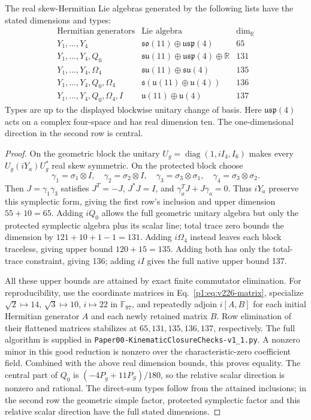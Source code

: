 \documentclass[11pt]{article}
\begin{document}
\begin{theorem}
\label{p1:thm:v226-control-lie}
The real skew-Hermitian Lie algebras generated by the following lists
have the stated dimensions and types:
\[
\begin{array}{c|c|c}
 \text{Hermitian generators}&\text{Lie algebra}&\dim_{\mathbb R}\\\hline
 Y_1,\ldots,Y_4&\mathfrak{so}(11)\oplus\mathfrak{usp}(4)&65\\
 Y_1,\ldots,Y_4,Q_0&\mathfrak{su}(11)\oplus\mathfrak{usp}(4)\oplus\mathbb R&131\\
 Y_1,\ldots,Y_4,\Omega_4&\mathfrak{su}(11)\oplus\mathfrak{su}(4)&135\\
 Y_1,\ldots,Y_4,Q_0,\Omega_4&\mathfrak{s}(\mathfrak u(11)\oplus\mathfrak u(4))&136\\
 Y_1,\ldots,Y_4,Q_0,\Omega_4,I&\mathfrak u(11)\oplus\mathfrak u(4)&137
\end{array}
\]
Types are up to the displayed blockwise unitary change of basis. Here
$\mathfrak{usp}(4)$ acts on a complex four-space and has real dimension ten.
The one-dimensional direction in the second row is central.
\end{theorem}
\begin{proof}
On the geometric block the unitary
$U_g=\operatorname{diag}(1,iI_4,I_6)$ makes every $U_g(iY_a)U_g^*$
real skew symmetric. On the protected block choose
\[
 \gamma_1=\sigma_1\otimes I,\quad
 \gamma_2=\sigma_2\otimes I,\quad
 \gamma_3=\sigma_3\otimes\sigma_1,\quad
 \gamma_4=\sigma_3\otimes\sigma_2.
\]
Then $J=\gamma_1\gamma_3$ satisfies $J^T=-J$, $J^*J=I$, and
$\gamma_a^TJ+J\gamma_a=0$. Thus $iY_a$ preserve this symplectic form,
giving the first row's inclusion and upper dimension $55+10=65$.
Adding $iQ_0$ allows the full geometric unitary algebra but only the
protected symplectic algebra plus its scalar line; total trace zero bounds
the dimension by $121+10+1-1=131$.
Adding $i\Omega_4$ instead leaves each block traceless, giving upper bound
$120+15=135$. Adding both has only the total-trace constraint, giving 136;
adding $iI$ gives the full native upper bound 137.

All these upper bounds are attained by exact finite commutator elimination.
For reproducibility, use the coordinate matrices in
Eq.~\ref{p1:eq:v226-matrix}, specialize
$\sqrt2\mapsto14$, $\sqrt3\mapsto10$, $i\mapsto22$ in $\mathbb F_{97}$,
and repeatedly adjoin $i[A,B]$ for each initial Hermitian generator $A$
and each newly retained matrix $B$. Row elimination of their flattened
matrices stabilizes at $65,131,135,136,137$, respectively. The full
algorithm is supplied in \texttt{Paper00-KinematicClosureChecks-v1\_1.py}.
A nonzero minor in this good reduction is nonzero over the characteristic-zero
coefficient field. Combined with the above real dimension bounds, this
proves equality. The central part of $Q_0$ is
$(-4P_g+11P_S)/180$, so the relative scalar direction is nonzero and rational.
The direct-sum types follow from the attained inclusions; in the second
row the geometric simple factor, protected symplectic factor and this
relative scalar direction have the full stated dimensions.
\end{proof}
\end{document}
